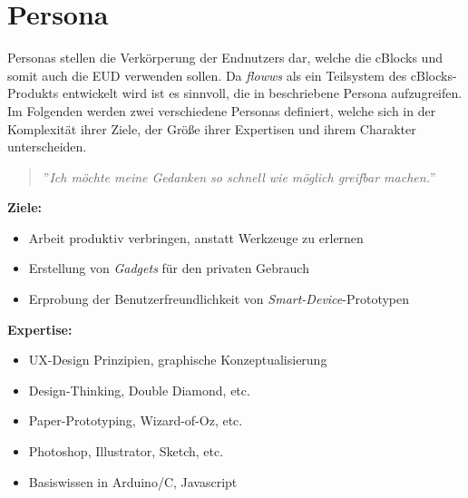 \section{Persona}\label{sec:persona}
Personas stellen die Verkörperung der Endnutzers dar, welche die cBlocks und somit auch die \ac{EUD} verwenden sollen. Da \textit{flowws} als ein Teilsystem des cBlocks-Produkts entwickelt wird ist es sinnvoll, die in \cite{weckbach2018cblocks} beschriebene Persona aufzugreifen. Im Folgenden werden zwei verschiedene Personas definiert, welche sich in der Komplexität ihrer Ziele, der Größe ihrer Expertisen und ihrem Charakter unterscheiden.

\begin{tcolorbox}[title={Persona \#1, Laura, 24, UX-Designerin},toptitle=3mm,bottomtitle=3mm, bicolor ,sidebyside,righthand width=3cm, sharp corners, boxrule=.4pt, colback=green!5, colbacklower=green!5, label=personalaura]
\begin{quote}
    ''\textit{Ich möchte meine Gedanken so schnell wie möglich greifbar machen.}''
\end{quote}
    \textbf{Ziele:} 
    \begin{itemize}
        \item Arbeit produktiv verbringen, anstatt Werkzeuge zu erlernen
        \item Erstellung von \textit{Gadgets} für den privaten Gebrauch
        \item Erprobung der Benutzerfreundlichkeit von \textit{Smart-Device}-Prototypen
    \end{itemize}
    \textbf{Expertise:} 
    \begin{itemize}
        \item \ac{UX}-Design Prinzipien, graphische Konzeptualisierung
        \item Design-Thinking, Double Diamond, etc.
        \item Paper-Prototyping, Wizard-of-Oz, etc.
        \item Photoshop, Illustrator, Sketch, etc.
        \item Basiswissen in Arduino/C, Javascript
    \end{itemize}
    
    \tcblower
    

\end{tcolorbox}
